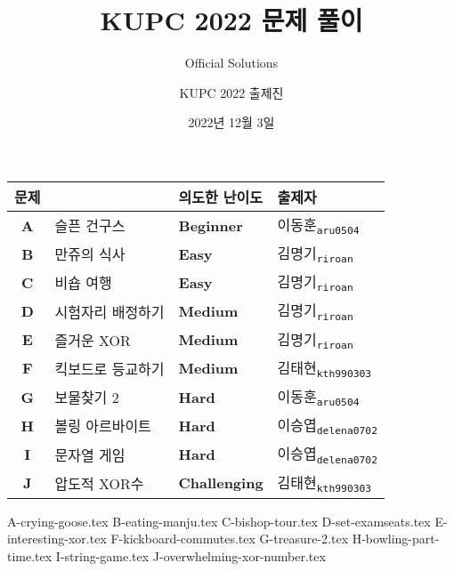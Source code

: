 
\usetikzlibrary{arrows.meta,matrix,decorations.pathreplacing}

\title{KUPC 2022 문제 풀이}
\subtitle{Official Solutions}
\author{KUPC 2022 출제진}
\date{2022년 12월 3일}


    \setcounter{framenumber}{-1}
    \frame{\titlepage}
        
    \begin{frame} %
        \begin{center}
            \begin{tabular}{cl|l|l}
                \hline
                문제 & & 의도한 난이도 & 출제자 \\
                \hline
                \hline

		\textbf{A} & 슬픈 건구스 & \textbf{\color{acbronze}Beginner} & 이동훈\textsubscript{\color{kupc-gray}\texttt{aru0504}} \\
                \textbf{B} & 만쥬의 식사& \textbf{\color{acbronze}Easy} & 김명기\textsubscript{\color{kupc-gray}\texttt{riroan}} \\
                \textbf{C} & 비숍 여행 & \textbf{\color{acbronze}Easy} & 김명기\textsubscript{\color{kupc-gray}\texttt{riroan}} \\
                \textbf{D} & 시험자리 배정하기 & \textbf{\color{acsilver}Medium} & 김명기\textsubscript{\color{kupc-gray}\texttt{riroan}} \\
                \textbf{E} & 즐거운 XOR & \textbf{\color{acsilver}Medium} & 김명기\textsubscript{\color{kupc-gray}\texttt{riroan}} \\
                \textbf{F} & 킥보드로 등교하기 & \textbf{\color{acsilver}Medium} & 김태현\textsubscript{\color{kupc-gray}\texttt{kth990303}} \\
                \textbf{G} & 보물찾기 2 & \textbf{\color{acgold}Hard} & 이동훈\textsubscript{\color{kupc-gray}\texttt{aru0504}} \\
                \textbf{H} & 볼링 아르바이트 & \textbf{\color{acgold}Hard} & 이승엽\textsubscript{\color{kupc-gray}\texttt{delena0702}}\\
                \textbf{I} & 문자열 게임 & \textbf{\color{acgold}Hard} & 이승엽\textsubscript{\color{kupc-gray}\texttt{delena0702}} \\
                \textbf{J} & 압도적 XOR수 & \textbf{\color{acgold}Challenging} & 김태현\textsubscript{\color{kupc-gray}\texttt{kth990303}} \\

                \hline
            \end{tabular}
        \end{center}
    \end{frame}
    {A-crying-goose.tex}
    {B-eating-manju.tex}
    {C-bishop-tour.tex}
    {D-set-examseats.tex}
    {E-interesting-xor.tex}
    {F-kickboard-commutes.tex}
    {G-treasure-2.tex}
    {H-bowling-part-time.tex}
    {I-string-game.tex}
    {J-overwhelming-xor-number.tex}


